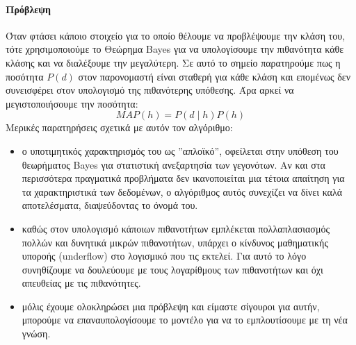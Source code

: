 \paragraph{Πρόβλεψη} Όταν φτάσει κάποιο στοιχείο για το οποίο θέλουμε να προβλέψουμε την κλάση του, τότε χρησιμοποιούμε το Θεώρημα Bayes για να υπολογίσουμε την πιθανότητα κάθε κλάσης και να διαλέξουμε την μεγαλύτερη. Σε αυτό το σημείο παρατηρούμε πως η ποσότητα $P(d)$ στον παρονομαστή είναι σταθερή
για κάθε κλάση και επομένως δεν συνεισφέρει στον υπολογισμό της πιθανότερης υπόθεσης. Άρα αρκεί να μεγιστοποιήσουμε την ποσότητα:
\begin{equation}
MAP(h)=P(d \mid h) P(h)
\end{equation}
Μερικές παρατηρήσεις σχετικά με αυτόν τον αλγόριθμο:
\begin{itemize}
	\item ο υποτιμητικός χαρακτηρισμός του ως ”απλοϊκό”, οφείλεται στην υπόθεση του θεωρήματος Bayes για στατιστική ανεξαρτησία των γεγονότων. Αν και στα περισσότερα πραγματικά προβλήματα δεν ικανοποιείται μια τέτοια απαίτηση για τα χαρακτηριστικά των δεδομένων, ο αλγόριθμος αυτός συνεχίζει να δίνει καλά αποτελέσματα, διαψεύδοντας το όνομά του.
	\item καθώς στον υπολογισμό κάποιων πιθανοτήτων εμπλέκεται πολλαπλασιασμός πολλών και δυνητικά μικρών πιθανοτήτων, υπάρχει ο κίνδυνος μαθηματικής υποροής (underflow) στο λογισμικό που τις εκτελεί. Για αυτό το λόγο συνηθίζουμε να δουλεύουμε με τους λογαρίθμους των πιθανοτήτων και όχι απευθείας με τις πιθανότητες.
	\item μόλις έχουμε ολοκληρώσει μια πρόβλεψη και είμαστε σίγουροι για αυτήν, μπορούμε να επαναυπολογίσουμε το μοντέλο για να το εμπλουτίσουμε με τη νέα γνώση.
\end{itemize}